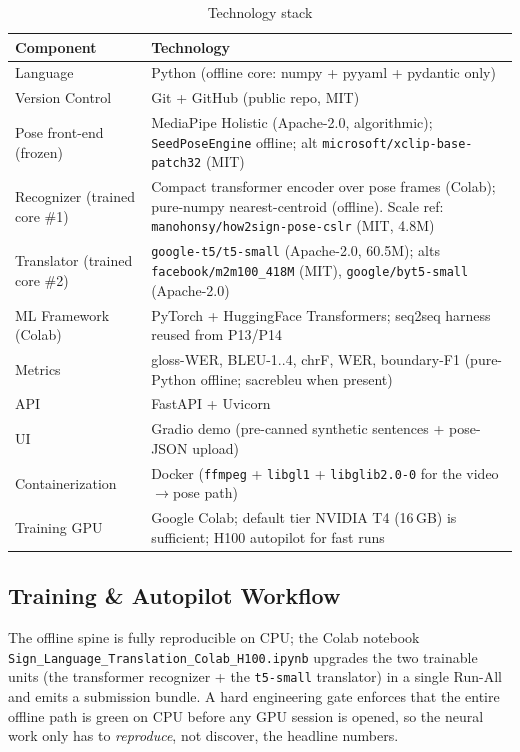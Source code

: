 \documentclass[12pt,a4paper]{article}
\begin{document}
\begin{table}[H]
\centering
\caption{Technology stack}
\small
\begin{tabularx}{\linewidth}{@{} l L @{}}
\toprule
\textbf{Component} & \textbf{Technology} \\
\midrule
Language & Python (offline core: numpy + pyyaml + pydantic only) \\
Version Control & Git + GitHub (public repo, MIT) \\
Pose front-end (frozen) & MediaPipe Holistic (Apache-2.0, algorithmic); \texttt{SeedPoseEngine} offline; alt \texttt{microsoft/xclip-base-patch32} (MIT) \\
Recognizer (trained core \#1) & Compact transformer encoder over pose frames (Colab); pure-numpy nearest-centroid (offline). Scale ref: \texttt{manohonsy/how2sign-pose-cslr} (MIT, 4.8M) \\
Translator (trained core \#2) & \texttt{google-t5/t5-small} (Apache-2.0, 60.5M); alts \texttt{facebook/m2m100\_418M} (MIT), \texttt{google/byt5-small} (Apache-2.0) \\
ML Framework (Colab) & PyTorch + HuggingFace Transformers; seq2seq harness reused from P13/P14 \\
Metrics & gloss-WER, BLEU-1..4, chrF, WER, boundary-F1 (pure-Python offline; sacrebleu when present) \\
API & FastAPI + Uvicorn \\
UI & Gradio demo (pre-canned synthetic sentences + pose-JSON upload) \\
Containerization & Docker (\texttt{ffmpeg} + \texttt{libgl1} + \texttt{libglib2.0-0} for the video$\rightarrow$pose path) \\
Training GPU & Google Colab; default tier NVIDIA T4 (16\,GB) is sufficient; H100 autopilot for fast runs \\
\bottomrule
\end{tabularx}
\end{table}

\subsection{Training \& Autopilot Workflow}
\label{subsec:workflow}

The offline spine is fully reproducible on CPU; the Colab notebook \texttt{Sign\_Language\_Translation\_Colab\_H100.ipynb} upgrades the two trainable units (the transformer recognizer + the \texttt{t5-small} translator) in a single Run-All and emits a submission bundle. A hard engineering gate enforces that the entire offline path is green on CPU before any GPU session is opened, so the neural work only has to \emph{reproduce}, not discover, the headline numbers.
\end{document}
